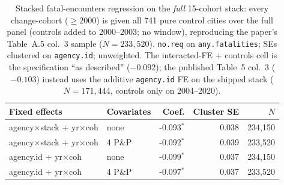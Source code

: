 \begin{table}[t]\centering
\caption{Stacked fatal-encounters regression on the \emph{full} 15-cohort stack:
every change-cohort ($\ge 2000$) is given all 741 pure control cities over the full
panel (controls added to 2000--2003; no window), reproducing the paper's Table~A.5
col.\ 3 sample ($N=233{,}520$). \texttt{no.req} on \texttt{any.fatalities}; SEs
clustered on \texttt{agency.id}; unweighted. The interacted-FE + controls cell is
the specification ``as described'' ($-0.092$); the published Table~5 col.\ 3
($-0.103$) instead uses the additive \texttt{agency.id} FE on the shipped stack
($N=171{,}444$, controls only on 2004--2020).}
\label{tab:stacked-full15}
\begin{tabular}{llrrr}
\toprule
Fixed effects & Covariates & Coef. & Cluster SE & $N$ \\
\midrule
agency$\times$stack + yr$\times$coh & none & -0.093$^{*}$ & 0.038 & 234,150 \\
agency$\times$stack + yr$\times$coh & 4 P\&P & -0.092$^{*}$ & 0.039 & 233,520 \\
agency.id + yr$\times$coh & none & -0.099$^{*}$ & 0.037 & 234,150 \\
agency.id + yr$\times$coh & 4 P\&P & -0.097$^{*}$ & 0.037 & 233,520 \\
\bottomrule
\end{tabular}
\end{table}
